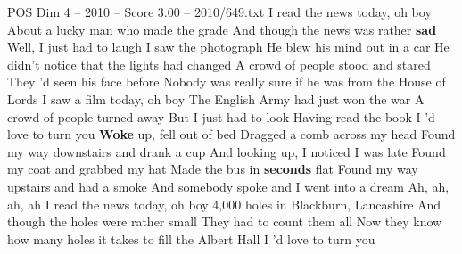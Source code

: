 \begin{textsample}{POS Dim 4 – 2010 – Score 3.00 – 2010/649.txt}  \label{ex:f4_pos_031}
I read the news today, oh boy About a lucky man who made the grade And though the news was rather \textbf{sad} Well, I just had to laugh I saw the photograph He blew his mind out in a car He didn't notice that the lights had changed A crowd of people stood and stared They 'd seen his face before Nobody was really sure if he was from the House of Lords I saw a film today, oh boy The English Army had just won the war A crowd of people turned away But I just had to look Having read the book I 'd love to turn you \textbf{Woke} up, fell out of bed Dragged a comb across my head Found my way downstairs and drank a cup And looking up, I noticed I was late Found my coat and grabbed my hat Made the bus in \textbf{seconds} flat Found my way upstairs and had a smoke And somebody spoke and I went into a dream Ah, ah, ah, ah I read the news today, oh boy 4,000 holes in Blackburn, Lancashire And though the holes were rather small They had to count them all Now they know how many holes it takes to fill the Albert Hall I 'd love to turn you

\end{textsample}
